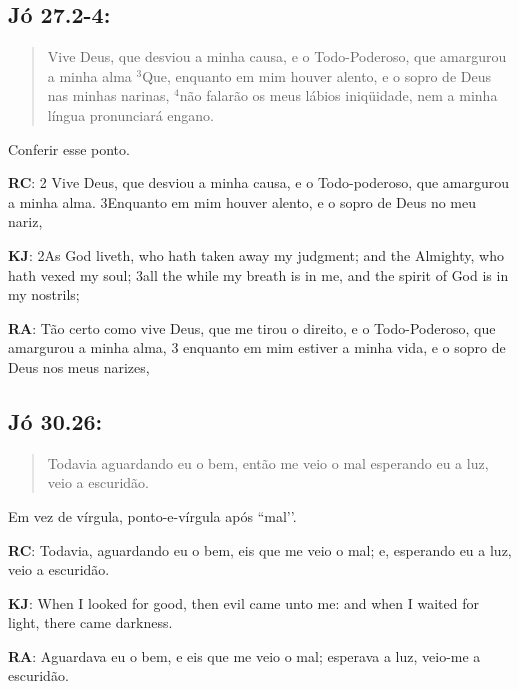 \subsection*{Jó 27.2-4:} 
 \begin{quote}
    \small
Vive Deus, que desviou a minha causa, e o Todo-Poderoso, que amargurou a minha alma $^{\mathrm{3}}$Que, enquanto em mim houver alento, e o sopro de Deus nas minhas narinas, $^{\mathrm{4}}$não falarão os meus lábios iniqüidade, nem a minha língua pronunciará engano.
 \end{quote}
 
Conferir esse ponto.

\textbf{RC}: 2 Vive Deus, que desviou a minha causa, e o Todo-poderoso, que amargurou a minha alma. 3Enquanto em mim houver alento, e o sopro de Deus no meu nariz,

\textbf{KJ}: 2As God liveth, who hath taken away my judgment; and the Almighty, who hath vexed my soul; 3all the while my breath is in me, and the spirit of God is in my nostrils;

\textbf{RA}: Tão certo como vive Deus, que me tirou o direito, e o Todo-Poderoso, que amargurou a minha alma, 3 enquanto em mim estiver a minha vida, e o sopro de Deus nos meus narizes,

\subsection*{Jó 30.26:} 
 \begin{quote}
    \small
Todavia aguardando eu o bem, então me veio o mal\uwave{,} esperando eu a luz, veio a escuridão.
\end{quote}

Em vez de vírgula, ponto-e-vírgula após ``mal’’.

\textbf{RC}: Todavia, aguardando eu o bem, eis que me veio o mal; e, esperando eu a luz, veio a escuridão.

\textbf{KJ}: When I looked for good, then evil came unto me: and when I waited for light, there came darkness.

\textbf{RA}: Aguardava eu o bem, e eis que me veio o mal; esperava a luz, veio-me a escuridão.

